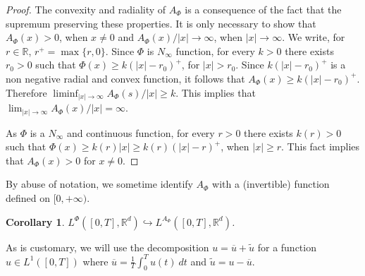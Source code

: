 \documentclass[twoside]{article}
\newtheorem{cor}[thm]{Corollary}
\theoremstyle{remark}
\newcounter{example}[section]
\newcommand{\lphi}{L^{\Phi}}
\newcommand{\rr}{\mathbb{R}}
\renewcommand{\leq}{\leqslant}
\renewcommand{\geq}{\geqslant}
\begin{document}
\begin{proof} The convexity and radiality of $A_{\Phi}$ is a consequence of the fact that the supremum preserving these properties. It is only necessary to show that $A_{\Phi}(x)>0$, when $x\neq 0$ and  $A_{\Phi}(x)/|x|\to\infty$, when $|x|\to\infty$. We write, for $r\in\rr$, $r^+=\max\{r,0\}$. Since $\Phi$ is $N_{\infty}$ function,  for every $k>0$ there exists $r_0>0$ such that  $\Phi(x)\geq k(|x|-r_0)^+$, for $|x|>r_0$.  Since $ k(|x|-r_0)^+$ is a non negative radial and convex function, it follows that $A_{\Phi}(x)\geq k(|x|-r_0)^+$. Therefore $\liminf_{|x|\to\infty} A_{\Phi}(s)/|x|\geq k$. This implies that   $\lim_{|x|\to\infty} A_{\Phi}(x)/|x|=\infty$.

As $\Phi$ is a
$N_{\infty}$ and continuous function, for every $r>0$ there exists $k(r)>0$ such that $\Phi(x)\geq k(r)|x|\geq k(r)(|x|-r)^+$, when $|x|\geq r$. This fact implies that $A_{\Phi}(x)>0$ for $x\neq 0$.
\end{proof}
By abuse of notation, we sometime identify $A_{\Phi}$ with a (invertible) function defined on $[0,+\infty)$. 
\begin{cor}\label{cor:incr_aphi} $\lphi([0,T],\rr^d) \hookrightarrow L^{A_{\Phi}}([0,T],\rr^d)$.

\end{cor}
% 
% 
% 
% 
% 
% 



 As is customary, we will use the decomposition $u=\overline{u}+\widetilde{u}$ for a function $u\in L^1([0,T])$  where $\overline{u} =\frac1T\int_0^T u(t)\ dt$ and $\widetilde{u}=u-\overline{u}$.
\end{document}
